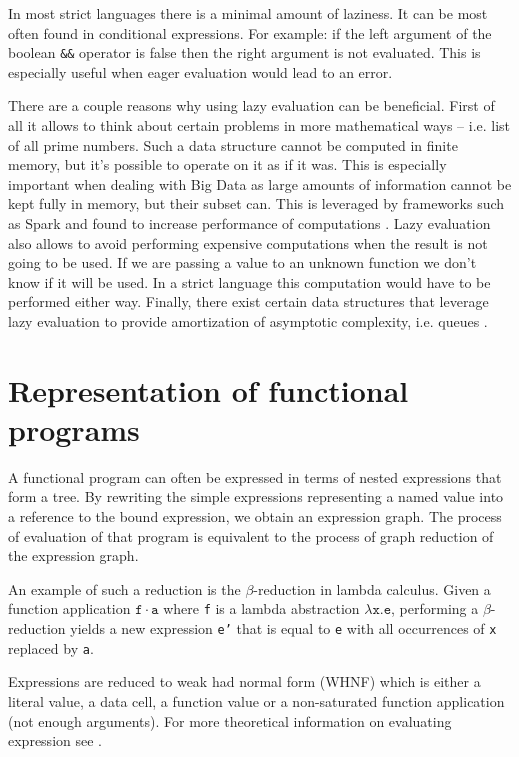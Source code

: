 \documentclass[en]{pracamgr}
\begin{document}
In most strict languages there is a minimal amount of
laziness. It can be most often found in conditional expressions.
For example: if the left argument of the
boolean \texttt{\&\&} operator is false then the right argument is not
evaluated. This is especially useful when eager evaluation would lead
to an error.

There are a couple reasons why using lazy evaluation can be beneficial.
First of all it allows to think about certain problems in more mathematical
ways -- i.e. list of all prime numbers. Such a data structure cannot
be computed in finite memory, but it's possible to operate on it as if it
was. This is especially important when dealing with Big Data as large
amounts of information cannot be kept fully in memory, but their subset can.
This is leveraged by frameworks such as Spark and found to increase performance
of computations \cite{lazySpark}. Lazy evaluation also allows to avoid
performing expensive computations when the result is not going to be used.
If we are passing a value to an unknown function we don't know if it 
will be used. In a strict language this computation would have to
be performed either way. Finally, there exist certain data structures that
leverage lazy evaluation to provide amortization of asymptotic complexity,
i.e. queues \cite{amortized}.

\section{Representation of functional programs}

A functional program can often be expressed in terms of
nested expressions that form a tree. By rewriting the
simple expressions representing a named value into a
reference to the bound expression, we obtain an expression
graph. The process of evaluation of that program is
equivalent to the process of graph reduction of the expression graph.

An example of such a reduction is the $\beta$-reduction in lambda calculus.
Given a function application $\mathtt{f\cdot a}$ where
\texttt{f} is a lambda abstraction $\mathtt{\lambda x. e}$,
performing a $\beta$-reduction yields a new expression
\texttt{e'} that is equal to \texttt{e} with all
occurrences of \texttt{x} replaced by \texttt{a}.

Expressions are reduced to weak had normal form (WHNF)
which is either a literal value, a data cell, a function
value or a non-saturated function application (not enough arguments).
For more theoretical information on evaluating expression see \cite{spj-book}.
\end{document}
